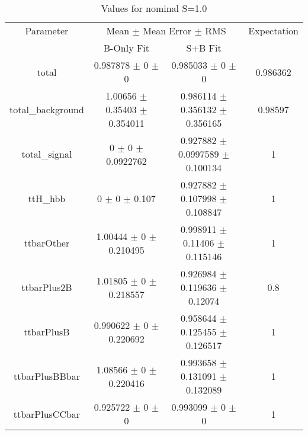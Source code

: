 \begin{table}
\centering
\caption{Values for nominal S=1.0}
\begin{tabular}{cccc}
\toprule
Parameter & \multicolumn{2}{c}{Mean $\pm$ Mean Error $\pm$ RMS} & Expectation\\
 & B-Only Fit & S+B Fit & \\
\midrule
total & \num{0.987878} $\pm$ \num{0} $\pm$ \num{0} & \num{0.985033} $\pm$ \num{0} $\pm$ \num{0} & \num{0.986362}\\
total\_background & \num{1.00656} $\pm$ \num{0.35403} $\pm$ \num{0.354011} & \num{0.986114} $\pm$ \num{0.356132} $\pm$ \num{0.356165} & \num{0.98597}\\
total\_signal & \num{0} $\pm$ \num{0} $\pm$ \num{0.0922762} & \num{0.927882} $\pm$ \num{0.0997589} $\pm$ \num{0.100134} & \num{1}\\
ttH\_hbb & \num{0} $\pm$ \num{0} $\pm$ \num{0.107} & \num{0.927882} $\pm$ \num{0.107998} $\pm$ \num{0.108847} & \num{1}\\
ttbarOther & \num{1.00444} $\pm$ \num{0} $\pm$ \num{0.210495} & \num{0.998911} $\pm$ \num{0.11406} $\pm$ \num{0.115146} & \num{1}\\
ttbarPlus2B & \num{1.01805} $\pm$ \num{0} $\pm$ \num{0.218557} & \num{0.926984} $\pm$ \num{0.119636} $\pm$ \num{0.12074} & \num{0.8}\\
ttbarPlusB & \num{0.990622} $\pm$ \num{0} $\pm$ \num{0.220692} & \num{0.958644} $\pm$ \num{0.125455} $\pm$ \num{0.126517} & \num{1}\\
ttbarPlusBBbar & \num{1.08566} $\pm$ \num{0} $\pm$ \num{0.220416} & \num{0.993658} $\pm$ \num{0.131091} $\pm$ \num{0.132089} & \num{1}\\
ttbarPlusCCbar & \num{0.925722} $\pm$ \num{0} $\pm$ \num{0} & \num{0.993099} $\pm$ \num{0} $\pm$ \num{0} & \num{1}\\
\bottomrule
\end{tabular}
\end{table}